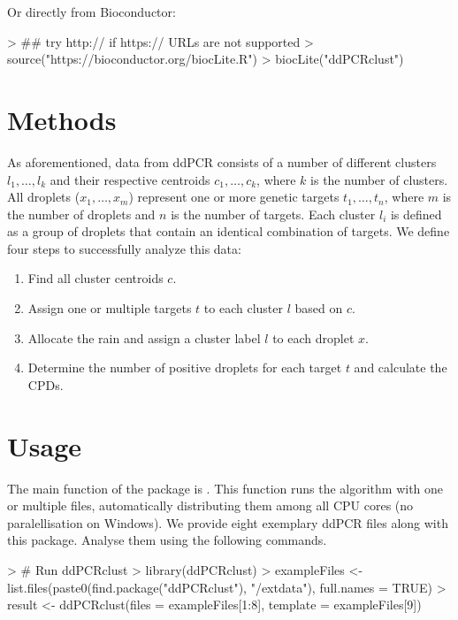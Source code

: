 \documentclass{article}
\begin{document}
Or directly from Bioconductor:

\begin{Schunk}
\begin{Sinput}
> ## try http:// if https:// URLs are not supported
> source("https://bioconductor.org/biocLite.R")
> biocLite("ddPCRclust")
\end{Sinput}
\end{Schunk}

\section{Methods}
As aforementioned, data from ddPCR consists of a number of different clusters $l_1, \dots, l_k$ and their respective centroids $c_1, \dots, c_k$, where $k$ is the number of clusters. All droplets ($x_1, \dots, x_m$) represent one or more genetic targets $t_1, \dots, t_n$, where $m$ is the number of droplets and $n$ is the number of targets. Each cluster $l_i$ is defined as a group of droplets that contain an identical combination of targets. We define four steps to successfully analyze this data:

\begin{enumerate}
\item Find all cluster centroids $c$.
\item Assign one or multiple targets $t$ to each cluster $l$ based on $c$.
\item Allocate the rain and assign a cluster label $l$ to each droplet $x$.
\item Determine the number of positive droplets for each target $t$ and calculate the CPDs.
\end{enumerate}

\section{Usage}
The main function of the package is . This function runs the algorithm with one or multiple files, automatically distributing them among all CPU cores (no paralellisation on Windows). We provide eight exemplary ddPCR files along with this package. Analyse them using the following commands.

\begin{Schunk}
\begin{Sinput}
> # Run ddPCRclust
> library(ddPCRclust)
> exampleFiles <- list.files(paste0(find.package("ddPCRclust"), "/extdata"), full.names = TRUE)
> result <- ddPCRclust(files = exampleFiles[1:8], template = exampleFiles[9])
\end{Sinput}
\end{Schunk}
\end{document}
